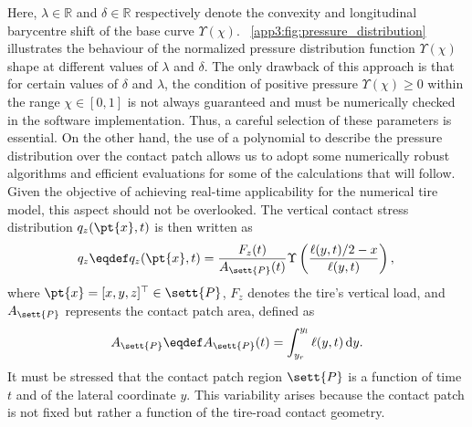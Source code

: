 %
Here, $\lambda \in \mathbb{R}$ and $\delta \in \mathbb{R}$ respectively denote the convexity and longitudinal barycentre shift of the base curve $\Upsilon(\chi)$. \figurename{}~\ref{app3:fig:pressure_distribution} illustrates the behaviour of the normalized pressure distribution function $\Upsilon(\chi)$ shape at different values of $\lambda$ and $\delta$. The only drawback of this approach is that for certain values of $\delta$ and $\lambda$, the condition of positive pressure $\Upsilon(\chi) \ge 0$ within the range $\chi \in [0,1]$ is not always guaranteed and must be numerically checked in the software implementation. Thus, a careful selection of these parameters is essential. On the other hand, the use of a polynomial to describe the pressure distribution over the contact patch allows us to adopt some numerically robust algorithms and efficient evaluations for some of the calculations that will follow. Given the objective of achieving real-time applicability for the numerical tire model, this aspect should not be overlooked. The vertical contact stress distribution $q_z(\pt{x},t)$ is then written as
%
\begin{equation}
  q_z \eqdef q_z(\pt{x},t) = \dfrac{F_z(t)}{A_\sett{P}(t)}\Upsilon\left(\dfrac{\ell(y,t)/2-x}{\ell(y,t)}\right), \\
  \label{app3:eq:vertical_stress}
\end{equation}
%
where $\pt{x} = [x,y,z]^\top \in \sett{P}$, $F_z$ denotes the tire's vertical load, and $A_\sett{P}$ represents the contact patch area, defined as
%
\begin{equation}
  A_\sett{P} \eqdef A_\sett{P}(t) = \displaystyle\int_{y_r}^{y_l} \ell(y,t)\,\mathrm{d}y.
\end{equation}
%
It must be stressed that the contact patch region $\sett{P}$ is a function of time $t$ and of the lateral coordinate $y$. This variability arises because the contact patch is not fixed but rather a function of the tire-road contact geometry.

